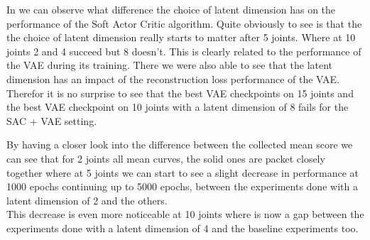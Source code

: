 In  we can observe what difference the choice of latent dimension has on the performance of the Soft Actor Critic algorithm. Quite obviously to see is that the the choice of latent dimension really starts to matter after 5 joints. Where at 10 joints 2 and 4 succeed but 8 doesn't. This is clearly related to the performance of the VAE during its training. There we were also able to see that the latent dimension has an impact of the reconstruction loss performance of the VAE. Therefor it is no surprise to see that the best VAE checkpoints on 15 joints and the best VAE checkpoint on 10 joints with a latent dimension of 8 fails for the SAC + VAE setting. 

By having a closer look into the difference between the collected mean score we can see that for 2 joints all mean curves, the solid ones are packet closely together where at 5 joints we can start to see a slight decrease in performance at 1000 epochs continuing up to 5000 epochs, between the experiments done with a latent dimension of 2 and the others.\\
This decrease is even more noticeable at 10 joints where is now a gap between the experiments done with a latent dimension of 4 and the baseline experiments too. 

